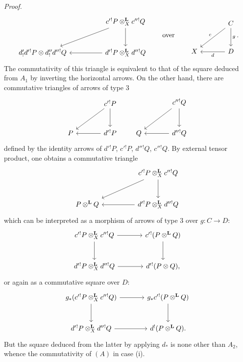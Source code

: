 \documentclass[11pt]{article}
\newenvironment{prooftext}[1][Proof]{\par\noindent\emph{#1.}\ }{\par\medskip}
\begin{document}
\begin{prooftext}[Proof]
\[
\begin{tikzcd}[column sep=huge,row sep=large]
& c'{}^!P\otimes_X^{\mathbf L}c''{}^!Q \arrow[d] \arrow[dl]\\
d'_!d'{}^!P\otimes d''_!d''{}^!Q &
d'{}^!P\otimes_X^{\mathbf L}d''{}^!Q\arrow[l]
\end{tikzcd}
\qquad\text{over}\qquad
\begin{tikzcd}[column sep=large,row sep=large]
& C\arrow[d,"g"]\arrow[dl,"c"']\\
X & D\arrow[l,"d"]
\end{tikzcd}.
\]
The commutativity of this triangle is equivalent to that of the square deduced from $A_1$ by inverting the horizontal arrows. On the other hand, there are commutative triangles of arrows of type $3$
\[
\begin{tikzcd}[column sep=large,row sep=large]
& c'{}^!P \arrow[d]\arrow[dl]\\
P & d'{}^!P\arrow[l]
\end{tikzcd}
\qquad
\begin{tikzcd}[column sep=large,row sep=large]
& c''{}^!Q \arrow[d]\arrow[dl]\\
Q & d''{}^!Q\arrow[l]
\end{tikzcd}
\]
defined by the identity arrows of $d'{}^!P$, $c'{}^!P$, $d''{}^!Q$, $c''{}^!Q$. By external tensor product, one obtains a commutative triangle
\[
\begin{tikzcd}[column sep=huge,row sep=large]
& c'{}^!P\otimes_X^{\mathbf L}c''{}^!Q \arrow[d]\arrow[dl]\\
P\otimes^{\mathbf L}Q & d'{}^!P\otimes_X^{\mathbf L}d''{}^!Q\arrow[l]
\end{tikzcd}
\]
which can be interpreted as a morphism of arrows of type $3$ over $g:C\longrightarrow D$:
\[
\begin{tikzcd}[column sep=large,row sep=large]
c'{}^!P\otimes_X^{\mathbf L}c''{}^!Q \arrow[r]\arrow[d] &
c'{}^!(P\otimes^{\mathbf L}Q)\arrow[d]\\
d'{}^!P\otimes_X^{\mathbf L}d''{}^!Q \arrow[r] &
d'{}^!(P\otimes Q),
\end{tikzcd}
\]
or again as a commutative square over $D$:
\[
\begin{tikzcd}[column sep=large,row sep=large]
g_*(c'{}^!P\otimes_X^{\mathbf L}c''{}^!Q) \arrow[r]\arrow[d] &
g_*c'{}^!(P\otimes^{\mathbf L}Q)\arrow[d]\\
d'{}^!P\otimes_X^{\mathbf L}d''{}^!Q \arrow[r] &
d^!(P\otimes^{\mathbf L}Q).
\end{tikzcd}
\]
But the square deduced from the latter by applying $d_*$ is none other than $A_2$, whence the commutativity of $(A)$ in case (i).


\end{prooftext}
\end{document}
